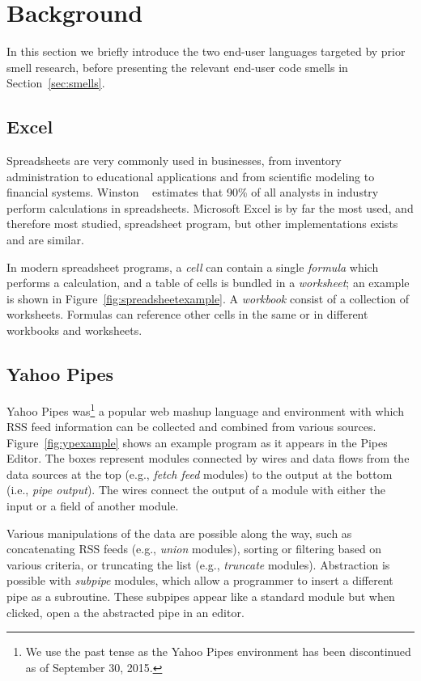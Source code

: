 \documentclass{sig-alternate}
\begin{document}
\section{Background}
\label{sec:background}
In this section we briefly introduce the two end-user languages targeted by prior smell research, before presenting the relevant end-user code smells in Section~\ref{sec:smells}.

\subsection{Excel} Spreadsheets are very commonly used in businesses, from inventory administration to educational applications and from scientific modeling to financial systems.
Winston ~\cite{Wins2001} estimates that 90\% of all analysts in industry perform calculations in spreadsheets. 
Microsoft Excel is by far the most used, and therefore most studied, spreadsheet program, but other implementations exists and are similar.

In modern spreadsheet programs, a \textit{cell} can contain a single \textit{formula} which performs a calculation, and a table of cells is bundled in a \textit{worksheet}; an example is shown in Figure~\ref{fig:spreadsheetexample}. 
A \textit{workbook} consist of a collection of worksheets.
Formulas can reference other cells in the same or in different workbooks and worksheets.


\subsection{Yahoo Pipes}
Yahoo Pipes was\footnote{We use the past tense as the Yahoo Pipes environment has been discontinued as of September 30, 2015.} a popular web mashup language and environment with which RSS feed information can be collected and combined from various sources.  Figure~\ref{fig:ypexample} shows an example program as it appears in the Pipes Editor. The boxes represent modules connected by wires and data flows from the data sources at the top  (e.g., \emph{fetch feed} modules) to the output at the bottom (i.e., \emph{pipe output}). The wires connect the output of a module with either the input or a field of another module. 

Various manipulations of the data are possible along the  way, such as concatenating RSS feeds (e.g., \emph{union} modules), sorting  or filtering based on various criteria, or truncating the list (e.g., \emph{truncate} modules). 
Abstraction is possible with \emph{subpipe} modules, which allow a programmer to insert a different pipe as a subroutine. These subpipes appear like a standard module but when clicked, open a the abstracted pipe in an editor. 
\end{document}
